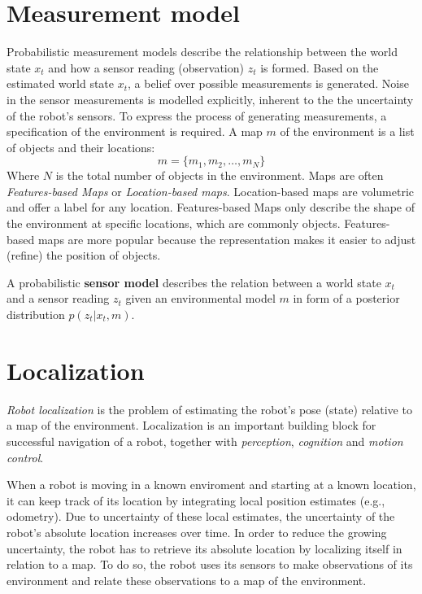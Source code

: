 		\section{Measurement model}
		\label{sec:measurement_model}
Probabilistic measurement models describe the relationship between the world state $x_t$ and how a sensor reading (observation) $z_t$ is formed.
Based on the estimated world state $x_t$, a belief over possible measurements is generated.
Noise in the sensor measurements is modelled explicitly, inherent to the the uncertainty of the robot's sensors.
To express the process of generating measurements, a specification of the environment is required.
A map $m$ of the environment is a list of objects and their locations:
\begin{equation}
m = \{m_1, m_2, \hdots, m_N\}
\end{equation}
Where $N$ is the total number of objects in the environment.
Maps are often \textit{Features-based Maps} or \textit{Location-based maps}.
Location-based maps are volumetric and offer a label for any location.
Features-based Maps only describe the shape of the environment at specific locations, which are commonly objects.
Features-based maps are more popular because the representation makes it easier to adjust (refine) the position of objects.
\begin{mydef}
A probabilistic \textbf{sensor model} describes the relation between a world state $x_t$ and a sensor reading $z_t$ given an environmental model $m$ in form of a posterior distribution $p (z_t | x_t, m)$.
\end{mydef}


		\section{Localization}
\label{sec:probabilistic-robotics-localization}
\textit{Robot localization} is the problem of estimating the robot's pose (state) relative to a map of the environment.
Localization is an important building block for successful navigation of a robot, together with \textit{perception}, \textit{cognition} and \textit{motion control}.

When a robot is moving in a known enviroment and starting at a known location, it can keep track of its location by integrating local position estimates (e.g., odometry).
Due to uncertainty of these local estimates, the uncertainty of the robot's absolute location increases over time.
In order to reduce the growing uncertainty, the robot has to retrieve its absolute location by localizing itself in relation to a map.
To do so, the robot uses its sensors to make observations of its environment and relate these observations to a map of the environment.

